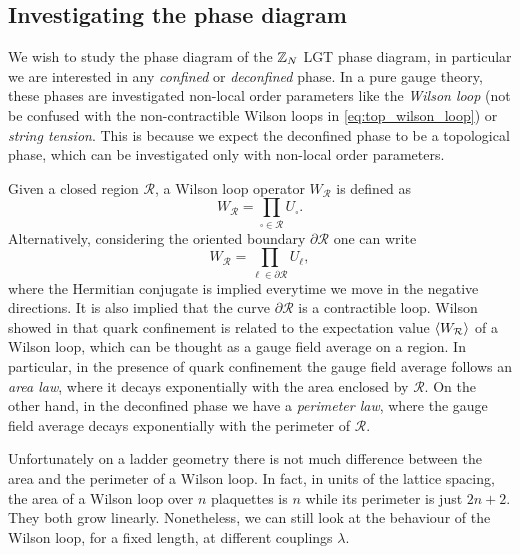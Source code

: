 \subsection{Investigating the phase diagram}%
\label{sub:investigating_the_phase_diagram}

We wish to study the phase diagram of the $\mathbb{Z}_N$ LGT phase diagram, in particular we are interested in any \emph{confined} or \emph{deconfined} phase.
In a pure gauge theory, these phases are investigated non-local order parameters like the \emph{Wilson loop} (not be confused with the non-contractible Wilson loops in \eqref{eq:top_wilson_loop}) or \emph{string tension}.
This is because we expect the deconfined phase to be a topological phase, which can be investigated only with non-local order parameters.

Given a closed region $\mathcal{R}$, a Wilson loop operator $W_{\mathcal{R}}$ is defined as
\begin{equation}
    W_{\mathcal{R}} = \prod_{\square \in \mathcal{R}} U_{\square}.
    \label{eq:closed_wilson_loop}
\end{equation}
Alternatively, considering the oriented boundary $\partial \mathcal{R}$ one can write
\begin{equation}
    W_{\mathcal{R}} = \prod_{\ell \in \partial \mathcal{R}} U_{\ell},
\end{equation}
where the Hermitian conjugate is implied everytime we move in the negative directions.
It is also implied that the curve $\partial \mathcal{R}$ is a contractible loop.
Wilson showed in \cite{wilson1974confinement} that quark confinement is related to the expectation value $\ev{W_{\mathcal{R}}}$ of a Wilson loop, which can be thought as a gauge field average on a region.
In particular, in the presence of quark confinement the gauge field average follows an \emph{area law}, where it decays exponentially with the area enclosed by $\mathcal{R}$.
On the other hand, in the deconfined phase we have a \emph{perimeter law}, where the gauge field average decays exponentially with the perimeter of $\mathcal{R}$.

Unfortunately on a ladder geometry there is not much difference between the area and the perimeter of a Wilson loop.
In fact, in units of the lattice spacing, the area of a Wilson loop over $n$ plaquettes is $n$ while its perimeter is just $2n+2$.
They both grow linearly.
Nonetheless, we can still look at the behaviour of the Wilson loop, for a fixed length, at different couplings $\lambda$.

